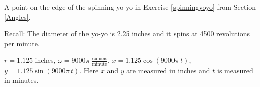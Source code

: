 {A point on the edge of the spinning yo-yo in Exercise \ref{spinningyoyo} from Section \ref{Angles}. 

Recall: The diameter of the yo-yo is 2.25 inches and it spins at 4500 revolutions per minute.}
{ $r = 1.125$ inches, $\omega = 9000 \pi \, \frac{\text{radians}}{\text{minute}}$,  $x = 1.125 \cos(9000 \pi \, t)$, $y = 1.125 \sin(9000 \pi \, t)$.  Here $x$ and $y$ are measured in inches and $t$ is measured in minutes.}